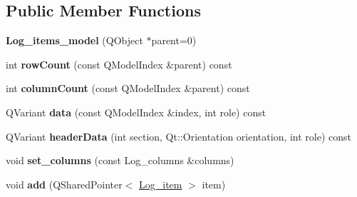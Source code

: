 \subsection*{Public Member Functions}
\begin{DoxyCompactItemize}
\item 
\hypertarget{class_log__viewer_1_1_log__items__model_ab38f8287204eee07e56f7f760d332b60}{{\bfseries Log\-\_\-items\-\_\-model} (Q\-Object $\ast$parent=0)}\label{class_log__viewer_1_1_log__items__model_ab38f8287204eee07e56f7f760d332b60}

\item 
\hypertarget{class_log__viewer_1_1_log__items__model_a36ce1d33ee6a53e762413e91606971e5}{int {\bfseries row\-Count} (const Q\-Model\-Index \&parent) const }\label{class_log__viewer_1_1_log__items__model_a36ce1d33ee6a53e762413e91606971e5}

\item 
\hypertarget{class_log__viewer_1_1_log__items__model_ad3608891e3d6add9b5ca6cbaf042f9e8}{int {\bfseries column\-Count} (const Q\-Model\-Index \&parent) const }\label{class_log__viewer_1_1_log__items__model_ad3608891e3d6add9b5ca6cbaf042f9e8}

\item 
\hypertarget{class_log__viewer_1_1_log__items__model_aa703d582b1947c4bd1ec08cb9ab14464}{Q\-Variant {\bfseries data} (const Q\-Model\-Index \&index, int role) const }\label{class_log__viewer_1_1_log__items__model_aa703d582b1947c4bd1ec08cb9ab14464}

\item 
\hypertarget{class_log__viewer_1_1_log__items__model_a5f242a7d86c3a41f49d2838492a5e8f2}{Q\-Variant {\bfseries header\-Data} (int section, Qt\-::\-Orientation orientation, int role) const }\label{class_log__viewer_1_1_log__items__model_a5f242a7d86c3a41f49d2838492a5e8f2}

\item 
\hypertarget{class_log__viewer_1_1_log__items__model_a54494daa82c96c64369cac5d5873ea7a}{void {\bfseries set\-\_\-columns} (const Log\-\_\-columns \&columns)}\label{class_log__viewer_1_1_log__items__model_a54494daa82c96c64369cac5d5873ea7a}

\item 
\hypertarget{class_log__viewer_1_1_log__items__model_a8975bf848715c81e639d2d1c3a841020}{void {\bfseries add} (Q\-Shared\-Pointer$<$ \hyperlink{class_log__viewer_1_1_log__item}{Log\-\_\-item} $>$ item)}\label{class_log__viewer_1_1_log__items__model_a8975bf848715c81e639d2d1c3a841020}


\end{DoxyCompactItemize}
